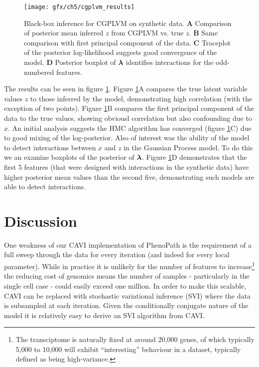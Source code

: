 \begin{figure}
  \centering
\texttt{[image: gfx/ch5/cgplvm\_results]}
\caption{Black-box inference for CGPLVM on synthetic data.
\textbf{A} Comparison of posterior mean inferred $z$ from CGPLVM vs. true $z$. %
\textbf{B} Same comparison with first principal component of the data. %
\textbf{C} Traceplot of the posterior log-likelihood suggests good convergence of the model.
\textbf{D} Posterior boxplot of $\bm{\lambda}$ identifies interactions for the odd-numbered features.
} \label{fig:cgplvm_results}
\end{figure}

The results can be seen in figure \ref{fig:cgplvm_results}. Figure \ref{fig:cgplvm_results}A compares the true latent variable values $z$ to those inferred by the model, demonstrating high correlation (with the exception of two points). Figure \ref{fig:cgplvm_results}B compares the first principal component of the data to the true values, showing obviousl correlation but also confounding due to $x$. An initial analysis suggests the HMC algorithm has converged (figure \ref{fig:cgplvm_results}C) due to good mixing of the log-posterior. Also of interest was the ability of the model to detect interactions between $x$ and $z$ in the Gaussian Process model. To do this we an examine boxplots of the posterior of $\bm{\lambda}$. Figure \ref{fig:cgplvm_results}D demonstrates that the first 5 features (that were designed with interactions in the synthetic data) have higher posterior mean values than the second five, demonstrating such models are able to detect interactions.


\section{Discussion}

One weakness of our CAVI implementation of PhenoPath is the requirement of a full sweep through the data for every iteration (and indeed for every local parameter). While in practice it is unlikely for the number of features to increase\footnote{The transciptome is naturally fixed at around 20,000 genes, of which typically 5,000 to 10,000 will exhibit ``interesting'' behaviour in a dataset, typically defined as being high-variance.} the reducing cost of genomics means the number of samples - particularly in the single cell case - could easily exceed one million. In order to make this scalable, CAVI can be replaced with stochastic variational inference (SVI) \cite{hoffman2013stochastic} where the data is subsampled at each iteration. Given the conditionally conjugate nature of the model it is relatively easy to derive an SVI algorithm from CAVI.

